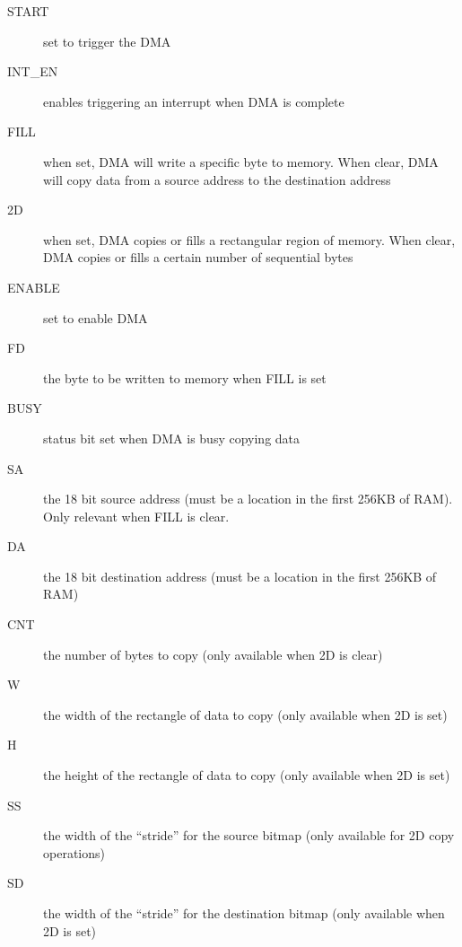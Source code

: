 \begin{description}
    \item[START] set to trigger the DMA

    \item[INT\_EN] enables triggering an interrupt when DMA is complete

    \item[FILL] when set, DMA will write a specific byte to memory. When clear, DMA will copy data from a source address to the destination address

    \item[2D] when set, DMA copies or fills a rectangular region of memory. When clear, DMA copies or fills a certain number of sequential bytes

    \item[ENABLE] set to enable DMA

    \item[FD] the byte to be written to memory when FILL is set

    \item[BUSY] status bit set when DMA is busy copying data

    \item[SA] the 18 bit source address (must be a location in the first 256KB of RAM). Only relevant when FILL is clear.

    \item[DA] the 18 bit destination address (must be a location in the first 256KB of RAM)

    \item[CNT] the number of bytes to copy (only available when 2D is clear)

    \item[W] the width of the rectangle of data to copy (only available when 2D is set)

    \item[H] the height of the rectangle of data to copy (only available when 2D is set)

    \item[SS] the width of the ``stride'' for the source bitmap (only available for 2D copy operations)

    \item[SD] the width of the ``stride'' for the destination bitmap (only available when 2D is set)
\end{description}

